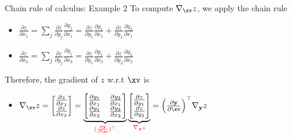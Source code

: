 \begin{frame}{Chain rule of calculus: Example 2}
To compute $\nabla_\xv z$, we apply the chain rule %
  \begin{itemize}
    \item $\frac {\partial z}{\partial x_1} = \sum_j \frac{\partial z}{\partial y_j} \frac{\partial y_j}{\partial x_1} = \frac {\partial z}{\partial y_1} \frac {\partial y_1}{\partial x_1} + \frac {\partial z}{\partial y_2} \frac {\partial y_2}{\partial x_1}$
    \item $\frac {\partial z}{\partial x_2} = \sum_j \frac{\partial z}{\partial y_j} \frac{\partial y_j}{\partial x_2} = \frac {\partial z}{\partial y_1} \frac {\partial y_1}{\partial x_2} + \frac {\partial z}{\partial y_2} \frac {\partial y_2}{\partial x_2}$
  \end{itemize}
  \vspace{2mm}
    Therefore, the gradient of $z$ w.r.t $\xv$ is
    \begin{itemize}
      \item  $\nabla_\xv z = \begin{bmatrix}
               \frac {\partial z}{\partial x_1} \\
               \frac {\partial z}{\partial x_2} \\
             \end{bmatrix} = \underbrace{\begin{bmatrix} \frac{\partial y_1}{\partial x_1}&\frac {\partial y_2}{\partial x_1}\\
                                             \frac {\partial y_1}{\partial x_2}&\frac {\partial y_2}{\partial x_2}\\
             \end{bmatrix}}_{\textcolor{red}{(\frac{\partial \mathbf{y}}{\partial \xv})^\top}} \underbrace{\begin{bmatrix} \frac {\partial z}{\partial y_1} \\
            \frac {\partial z}{\partial y_2} \\ \end{bmatrix}}_{\textcolor{red}{\nabla_{\mathbf{y}} z}} = \Big(\frac{\partial \mathbf{y}}{\partial \xv}\Big)^\top \nabla_{\mathbf{y}} z $
  \end{itemize}
\end{frame}


